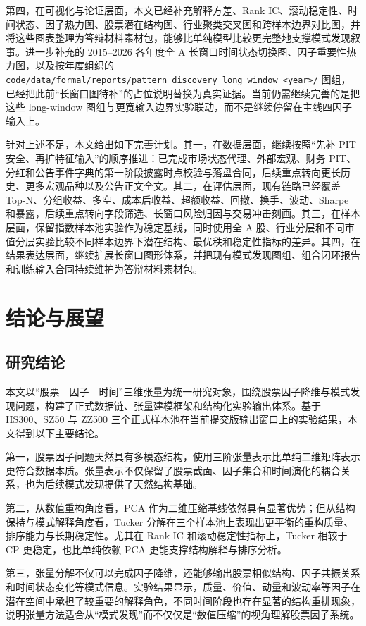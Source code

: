 第四，在可视化与论证层面，本文已经补充解释方差、Rank IC、滚动稳定性、时间状态、因子热力图、股票潜在结构图、行业聚类交叉图和跨样本边界对比图，并将这些图表整理为答辩材料素材包，能够比单纯模型比较更完整地支撑模式发现叙事。进一步补充的 2015--2026 各年度全 A 长窗口时间状态切换图、因子重要性热力图，以及按年度组织的 \texttt{code/data/formal/reports/pattern\_discovery\_long\_window\_<year>/} 图组，已经把此前“长窗口图待补”的占位说明替换为真实证据。当前仍需继续完善的是把这些 long-window 图组与更宽输入边界实验联动，而不是继续停留在主线四因子输入上。

针对上述不足，本文给出如下完善计划。其一，在数据层面，继续按照“先补 PIT 安全、再扩特征输入”的顺序推进：已完成市场状态代理、外部宏观、财务 PIT、分红和公告事件字典的第一阶段披露时点校验与落盘合同，后续重点转向更长历史、更多宏观品种以及公告正文全文。其二，在评估层面，现有链路已经覆盖 Top-N、分组收益、多空、成本后收益、超额收益、回撤、换手、波动、Sharpe 和暴露，后续重点转向字段筛选、长窗口风险归因与交易冲击刻画。其三，在样本层面，保留指数样本池实验作为稳定基线，同时使用全 A 股、行业分层和不同市值分层实验比较不同样本边界下潜在结构、最优秩和稳定性指标的差异。其四，在结果表达层面，继续扩展长窗口图形体系，并把现有模式发现图组、组合闭环报告和训练输入合同持续维护为答辩材料素材包。

\chapter{结论与展望}

\section{研究结论}

本文以“股票—因子—时间”三维张量为统一研究对象，围绕股票因子降维与模式发现问题，构建了正式数据链、张量建模框架和结构化实验输出体系。基于 HS300、SZ50 与 ZZ500 三个正式样本池在当前提交版输出窗口上的实验结果，本文得到以下主要结论。

第一，股票因子问题天然具有多模态结构，使用三阶张量表示比单纯二维矩阵表示更符合数据本质。张量表示不仅保留了股票截面、因子集合和时间演化的耦合关系，也为后续模式发现提供了天然结构基础。

第二，从数值重构角度看，PCA 作为二维压缩基线依然具有显著优势；但从结构保持与模式解释角度看，Tucker 分解在三个样本池上表现出更平衡的重构质量、排序能力与长期稳定性。尤其在 Rank IC 和滚动稳定性指标上，Tucker 相较于 CP 更稳定，也比单纯依赖 PCA 更能支撑结构解释与排序分析。

第三，张量分解不仅可以完成因子降维，还能够输出股票相似结构、因子共振关系和时间状态变化等模式信息。实验结果显示，质量、价值、动量和波动率等因子在潜在空间中承担了较重要的解释角色，不同时间阶段也存在显著的结构重排现象，说明张量方法适合从“模式发现”而不仅仅是“数值压缩”的视角理解股票因子系统。

